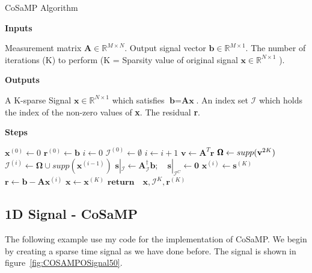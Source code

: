 \documentclass[titlepage,oneside, 12pt]{book}
\theoremstyle{break}
\begin{document}
\begin{algorithm}[H]
  \caption{CoSaMP Algorithm}
  \bigskip	
  \textbf{Inputs}%
  \begin{algorithmic}[1]
    \State Measurement matrix $\textbf{A} \in \mathbb{R}^{M \times N}$.
    \State Output signal vector $\textbf{b} \in \mathbb{R}^{M \times 1}$.
    \State The number of iterations (K) to perform (K = Sparsity value of original signal $\textbf{x} \in \mathbb{R}^{N \times 1}$ ). 
  \end{algorithmic}
  \bigskip  
  \textbf{Outputs}%
  \begin{algorithmic}[1]
    \State A K-sparse Signal $\textbf{x}\in \mathbb{R}^{N \times 1}$ which satisfies $\textbf{b} = \textbf{A}\textbf{x}$.
     \State An index set $\pmb{\mathcal{I}}$ which holds the index of the non-zero values of \textbf{x}. 
       \State The residual \textbf{r}. 
  \end{algorithmic}
  \bigskip
  \textbf{Steps}%
  \begin{algorithmic}[1]
   \State $\textbf{x}^{(0)} \gets 0$
\State $\textbf{r}^{(0)} \gets \textbf{b}$
\State $i \gets 0$
   \State $\pmb{\mathcal{I}}^{(0)} \gets \emptyset$
   \State $i \gets i + 1$
   \State $\textbf{v} \gets \textbf{A}^{T}\textbf{r}$
   \State $\pmb{\Omega} \gets supp(\textbf{\textbf{v}}^{2K})$
   \State $\pmb{\mathcal{I}}^{(i)} \gets \pmb{\Omega} \cup supp(\textbf{x}^{(i-1)})$ 
\State$\textbf{s}|_{\pmb{\mathcal{I}}} \gets \textbf{A}^{\dagger}_{\pmb{\mathcal{I}}}\textbf{b}; \quad \textbf{s}|_{{\pmb{\mathcal{I}}}^{C}} \gets \textbf{0}$ 
   \State $\textbf{x}^{(i)} \gets \textbf{s}^{(K)} $
   \State $\textbf{r} \gets \textbf{b} - \textbf{A}\textbf{x}^{(i)} $
   \EndWhile
    \State $\textbf{x} \gets \textbf{x}^{(K)}$
   \State $\textbf{return} \quad \textbf{x},\pmb{\mathcal{I}}^{K}, \textbf{r}^{(K)}$ 
   \EndProcedure
  \end{algorithmic}
  \end{algorithm}

\newpage
\subsection{1D Signal - CoSaMP}

The following example use my code for the implementation of CoSaMP. We begin by creating a sparse time signal as we have done before. The signal is shown in figure~\ref{fig:COSAMPOSignal50}.
\end{document}
